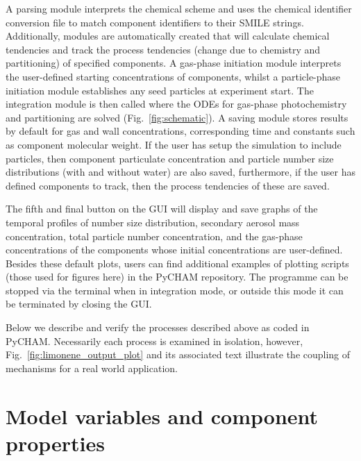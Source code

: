 \documentclass[gmd, manuscript]{copernicus}
\begin{document}
A parsing module interprets the chemical scheme and uses the chemical identifier conversion file to match component identifiers to their SMILE strings.  Additionally, modules are automatically created that will calculate chemical tendencies and track the process tendencies (change due to chemistry and partitioning) of specified components.  A gas-phase initiation module interprets the user-defined starting concentrations of components, whilst a particle-phase initiation module establishes any seed particles at experiment start.  The integration module is then called where the ODEs for gas-phase photochemistry and partitioning are solved (Fig.~\ref{fig:schematic}).  A saving module stores results by default for gas and wall concentrations, corresponding time and constants such as component molecular weight.  If the user has setup the simulation to include particles, then component particulate concentration and particle number size distributions (with and without water) are also saved, furthermore, if the user has defined components to track, then the process tendencies of these are saved.    

The fifth and final button on the GUI will display and save graphs of the temporal profiles of number size distribution, secondary aerosol mass concentration, total particle number concentration, and the gas-phase concentrations of the components whose initial concentrations are user-defined.  Besides these default plots, users can find additional examples of plotting scripts (those used for figures here) in the PyCHAM repository.  The programme can be stopped via the terminal when in integration mode, or outside this mode it can be terminated by closing the GUI.

Below we describe and verify the processes described above as coded in PyCHAM.  Necessarily each process is examined in isolation, however, Fig.~\ref{fig:limonene_output_plot} and its associated text illustrate the coupling of mechanisms for a real world application.


\section{Model variables and component properties}\label{sec:prop}
\end{document}
